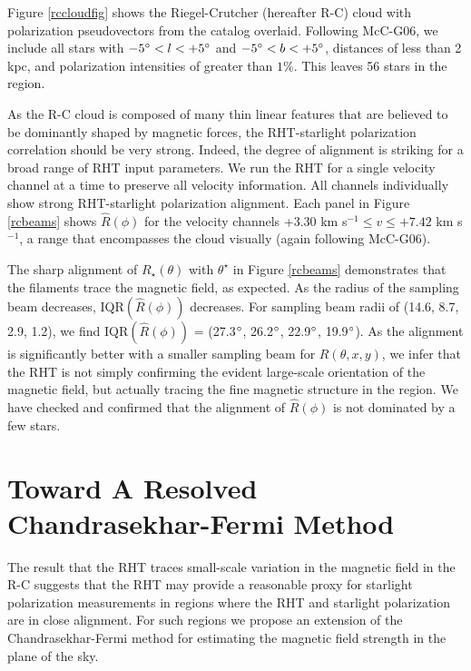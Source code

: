\documentclass[12pt]{emulateapj}
\begin{document}
Figure \ref{rccloudfig} shows the Riegel-Crutcher (hereafter R-C) cloud with polarization pseudovectors from the \cite{Heiles:2000un} catalog overlaid. Following McC-G06, we include all stars with ${-5 \degree < l < +5 \degree}$ and ${-5 \degree < b < +5 \degree}$, distances of less than 2 kpc, and polarization intensities of greater than ${1\%}$. This leaves 56 stars in the region. 

As the R-C cloud is composed of many thin linear features that are believed to be dominantly shaped by magnetic forces, the RHT-starlight polarization correlation should be very strong. Indeed, the degree of alignment is striking for a broad range of RHT input parameters. We run the RHT for a single velocity channel at a time to preserve all velocity information. All channels individually show strong RHT-starlight polarization alignment. Each panel in Figure \ref{rcbeams} shows ${\hat{R}\left(\phi\right)}$ for the velocity channels +3.30 km s${^{-1} \le v \le +7.42}$ km s${^{-1}}$, a range that encompasses the cloud visually (again following McC-G06).

The sharp alignment of ${R}_\star\left(\theta\right)$ with $\theta^\star$ in Figure \ref{rcbeams} demonstrates that the filaments trace the magnetic field, as expected. As the radius of the sampling beam decreases, IQR$(\hat{R}\left(\phi\right))$ decreases. For sampling beam radii of (14.6\arcmin, 8.7\arcmin, 2.9\arcmin, 1.2\arcmin), we find IQR$(\hat{R}\left(\phi\right))$ = (27.3$\degree$, 26.2$\degree$, 22.9$\degree$, 19.9$\degree$). As the alignment is significantly better with a smaller sampling beam for $R\left(\theta, x, y\right)$, we infer that the RHT is not simply confirming the evident large-scale orientation of the magnetic field, but actually tracing the fine magnetic structure in the region. We have checked and confirmed that the alignment of $\hat{R}\left(\phi\right)$ is not dominated by a few stars. \\

\section{Toward A Resolved Chandrasekhar-Fermi Method}\label{cfmethod}
The result that the RHT traces small-scale variation in the magnetic field in the R-C suggests that the RHT may provide a reasonable proxy for starlight polarization measurements in regions where the RHT and starlight polarization are in close alignment. For such regions we propose an extension of the Chandrasekhar-Fermi method for estimating the magnetic field strength in the plane of the sky.
\end{document}
